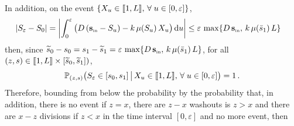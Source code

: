 \documentclass[AHL,Unicode,longabstracts,published]{cedram}
\newcommand{\llbracket}{\mathopen{[\mkern -2.7mu[}}
\newcommand{\rrbracket}{\mathclose{]\mkern -2.7mu]}}
\newcommand{\PP}{\mathbb{P}}
\newcommand{\Sin}{{\mathbf s}_{\textrm{\tiny\rm in}}}
\newcommand{\dif}{\mathrm{d}}
\newcommand{\barmu}{\mu(\bar s_1)}
\newcommand{\1}{\mathbf{1}}
\let\oldtilde\tilde
\renewcommand*{\tilde}[1]{\mathchoice{\widetilde{#1}}{\widetilde{#1}}{\oldtilde{#1}}{\oldtilde{#1}}}
\let\oldforall\forall
\renewcommand*{\forall}{\mathrel{\oldforall}}
\begin{document}
In addition, on the event $\left\{X_u \in \llbracket 1, L \rrbracket,\, \forall u\in[0,\varepsilon]\right\}$,
\begin{align*}
\left|S_\varepsilon-S_0 \right| &= \left|\int_0^\varepsilon \big(D\,(\Sin-S_u)-k\,\mu(S_u)\,X_u \big)\,\dif u\right|
\leq \varepsilon\,\max\{D\,\Sin,\, k\,\barmu\, L\}
\end{align*}
then, since $\tilde s_0-s_0=s_1-\tilde s_1=\varepsilon\,\max\{D\,\Sin,\, k\,\barmu\, L\}$, for all $(z,s)\in \llbracket 1, L \rrbracket \times [\tilde s_0,\tilde s_1])$,
\[
\PP_{(z,s)}\big(S_\varepsilon \in [s_0,s_1] \, \big| \, X_u \in \llbracket 1, L \rrbracket,\, \forall u\in[0,\varepsilon]\big) =1\,.
\]
Therefore, bounding from below the probability by the probability that, in addition, there is no event if $z=x$, there are $z-x$ washouts is $z>x$ and there are $x-z$ divisions if $z<x$ in the time interval $[0,\varepsilon]$ and no more event, then
\end{document}
